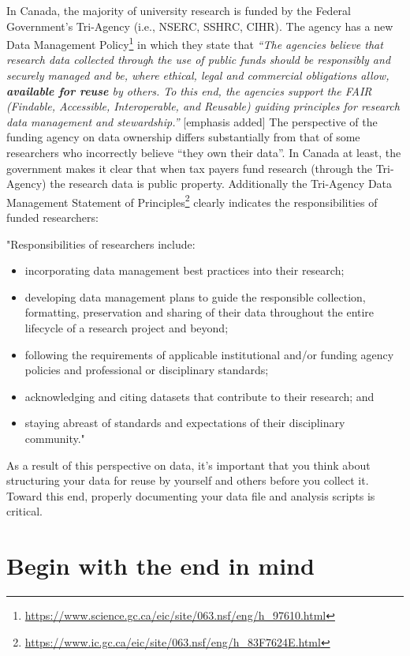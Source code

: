 \documentclass[
]{krantz}
\providecommand{\tightlist}{%
  \setlength{\itemsep}{0pt}\setlength{\parskip}{0pt}}
\renewcommand{\href}[2]{#2\footnote{\url{#1}}}
\begin{document}
In Canada, the majority of university research is funded by the Federal Government's Tri-Agency (i.e., NSERC, SSHRC, CIHR). The agency has a new \href{https://www.science.gc.ca/eic/site/063.nsf/eng/h_97610.html}{Data Management Policy} in which they state that \emph{``The agencies believe that research data collected through the use of public funds should be responsibly and securely managed and be, where ethical, legal and commercial obligations allow, \textbf{available for reuse} by others. To this end, the agencies support the FAIR (Findable, Accessible, Interoperable, and Reusable) guiding principles for research data management and stewardship.''} {[}emphasis added{]} The perspective of the funding agency on data ownership differs substantially from that of some researchers who incorrectly believe ``they own their data''. In Canada at least, the government makes it clear that when tax payers fund research (through the Tri-Agency) the research data is public property. Additionally the \href{https://www.ic.gc.ca/eic/site/063.nsf/eng/h_83F7624E.html}{Tri-Agency Data Management Statement of Principles} clearly indicates the responsibilities of funded researchers:

"Responsibilities of researchers include:

\begin{itemize}
\tightlist
\item
  incorporating data management best practices into their research;
\item
  developing data management plans to guide the responsible collection, formatting, preservation and sharing of their data throughout the entire lifecycle of a research project and beyond;
\item
  following the requirements of applicable institutional and/or funding agency policies and professional or disciplinary standards;
\item
  acknowledging and citing datasets that contribute to their research; and
\item
  staying abreast of standards and expectations of their disciplinary community."
\end{itemize}

As a result of this perspective on data, it's important that you think about structuring your data for reuse by yourself and others before you collect it. Toward this end, properly documenting your data file and analysis scripts is critical.

\hypertarget{begin-with-the-end-in-mind}{%
\section{Begin with the end in mind}\label{begin-with-the-end-in-mind}}
\end{document}
